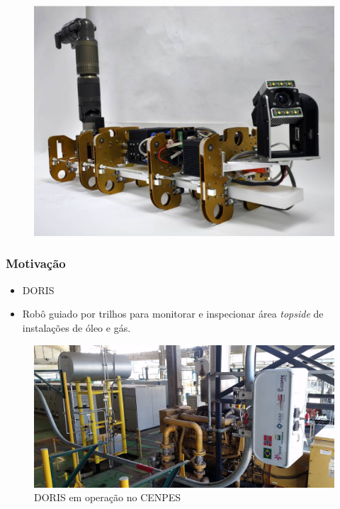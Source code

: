 \documentclass{beamer}
\begin{document}
\begin{frame}
\begin{figure}[htp]
{  \includegraphics[height=\twosubht]{./img/artis.png}%
}
\end{figure}


\end{frame}


\begin{frame}
\frametitle{Motivação}
\begin{itemize}
\item DORIS
\item Robô guiado por trilhos para monitorar e inspecionar área \textit{topside} de instalações de óleo e gás.
\end{itemize}
\begin{figure}
\includegraphics[width=0.8\linewidth]{./img/cenpes_field.jpg}
\caption{DORIS em operação no CENPES}
\end{figure}
\end{frame}

\end{document}
